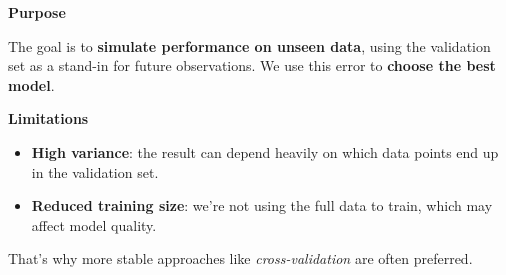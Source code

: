 \highspace
\begin{flushleft}
    \textcolor{Green3}{ \textbf{Purpose}}
\end{flushleft}
The goal is to \textbf{simulate performance on unseen data}, using the validation set as a stand-in for future observations. We use this error to \textbf{choose the best model}.

\highspace
\begin{flushleft}
    \textcolor{Red2}{ \textbf{Limitations}}
\end{flushleft}
\begin{itemize}
    \item \textbf{High variance}: the result can depend heavily on which data points end up in the validation set.
    \item \textbf{Reduced training size}: we're not using the full data to train, which may affect model quality.
\end{itemize}
That's why more stable approaches like \emph{cross-validation} are often preferred.